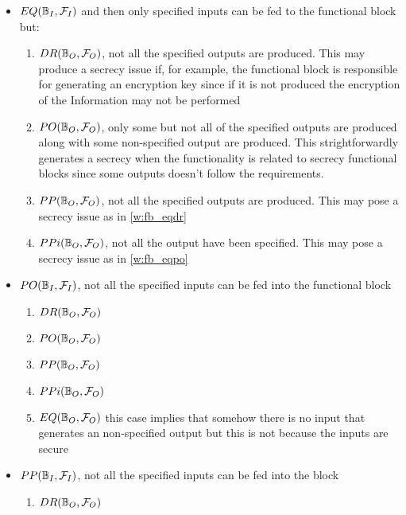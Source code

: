 \begin{itemize}
	\item $EQ(\mathbb{B}_I,\mathcal{F}_I)$ and then only specified
		inputs can be fed to the functional block but:
	\begin{enumerate}[start=49, label={W\arabic*)}]
		\item\label{w:fb_eqdr} $DR(\mathbb{B}_O,\mathcal{F}_O)$, not all the specified
			outputs are produced. This may produce a secrecy issue if, for example,
			the functional block is responsible for generating an encryption key since
			if it is not produced the encryption of the Information may not be performed
		\item\label{w:fb_eqpo} $PO(\mathbb{B}_O,\mathcal{F}_O)$, only some but not all of the specified
			outputs are produced along with some non-specified output are produced. This
			strightforwardly generates a secrecy when the functionality is 
			related to secrecy functional blocks since some outputs doesn't follow
			the requirements.
		\item $PP(\mathbb{B}_O,\mathcal{F}_O)$, not all the specified outputs are produced.
			This may pose a secrecy issue as in \ref{w:fb_eqdr}
		\item $PPi(\mathbb{B}_O,\mathcal{F}_O)$, not all the output have been specified.
			This may pose a secrecy issue as in \ref{w:fb_eqpo}
	\end{enumerate}
	\item $PO(\mathbb{B}_I,\mathcal{F}_I)$, not all the specified inputs can be fed into the functional block
	\begin{enumerate}[start=53, label={W\arabic*)}]
		\item $DR(\mathbb{B}_O,\mathcal{F}_O)$
		\item $PO(\mathbb{B}_O,\mathcal{F}_O)$
		\item $PP(\mathbb{B}_O,\mathcal{F}_O)$
		\item $PPi(\mathbb{B}_O,\mathcal{F}_O)$
		\item $EQ(\mathbb{B}_O,\mathcal{F}_O)$ this case implies
			that somehow there is no input that generates an
			non-specified output but this is not because the inputs
			are secure 
	\end{enumerate}
	\item $PP(\mathbb{B}_I,\mathcal{F}_I)$, not all the specified
		inputs can be fed into the block
	\begin{enumerate}[start=58, label={W\arabic*)}]
		\item $DR(\mathbb{B}_O,\mathcal{F}_O)$

\end{enumerate}
\end{itemize}
